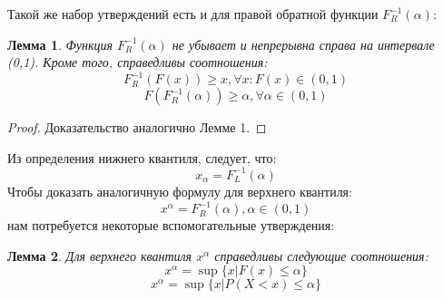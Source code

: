 \documentclass[18pt,a4paper]{article}
\theoremstyle{plain}
\newtheorem{Lemma}{Лемма}[section]
\theoremstyle{definition}
\begin{document}
Такой же набор утверждений есть и для правой обратной функции $F^{-1}_{R}(\alpha)$:\\
\begin{Lemma} \label{main} Функция $F^{-1}_{R}(\alpha)$ не убывает и непрерывна справа на интервале (0,1). Кроме того, справедливы соотношения:
\begin{equation}
F^{-1}_{R}(F(x))\ge x,  \forall x: F(x) \in (0,1)
\end{equation}
\begin{equation}
F(F^{-1}_{R}(\alpha)) \ge \alpha,  \forall \alpha \in (0,1)
\end{equation}
\end{Lemma}

\begin{proof}
Доказательство аналогично Лемме 1.
\end{proof}

Из определения нижнего квантиля, следует, что:\\
$$
x_{\alpha} = F^{-1}_{L}(\alpha)
$$
Чтобы доказать аналогичную формулу для верхнего квантиля:\\
$$
x^{\alpha} = F^{-1}_{R}(\alpha), \alpha \in (0,1)
$$
нам потребуется некоторые вспомогательные утверждения:\\

\begin{Lemma} \label{main}
Для верхнего квантиля $x^{\alpha}$ справедливы следующие соотношения:
\begin{equation}
x^{\alpha} = \sup \{ x| F(x) \le \alpha \}
\end{equation}
\begin{equation}
x^{\alpha} = \sup \{ x| P(X<x) \le \alpha \}
\end{equation}
\end{Lemma}
\end{document}

